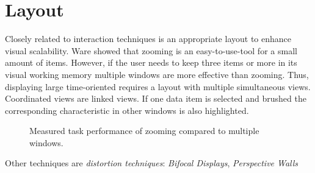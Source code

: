 \section{Layout}
Closely related to interaction techniques is an appropriate layout to enhance visual scalability. Ware\cite{Ware2012} showed that zooming is an easy-to-use-tool for a small amount of items. However, if the user needs to keep three items or more in its visual working memory multiple windows are more effective than zooming. Thus, displaying large time-oriented requires a layout with multiple simultaneous views. Coordinated views are linked views. If one data item is selected and brushed the corresponding characteristic in other windows is also highlighted.
\begin{figure}[H]
    \centering
    \caption{Measured task performance of zooming compared to multiple windows. \cite{Ware2012a}}
    \label{fig:my_label}
\end{figure}
Other techniques are \textit{distortion techniques}\cite{mackinlay1991perspective}: \textit{Bifocal Displays}\cite{Spence1982}, \textit{Perspective Walls}\cite{mackinlay1991perspective}